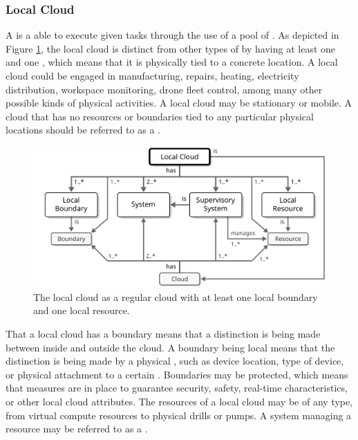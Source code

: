 \subsubsection{Local Cloud}
\label{sec:reference-model:system-of-systems:local-cloud}

A  is a  able to execute given tasks through the use of a pool of .
As depicted in Figure \ref{fig:local-cloud}, the local cloud is distinct from other types of  by having at least one  and one , which means that it is physically tied to a concrete location.
A local cloud could be engaged in manufacturing, repairs, heating, electricity distribution, workspace monitoring, drone fleet control, among many other possible kinds of physical activities.
A local cloud may be stationary or mobile.
A cloud that has no resources or boundaries tied to any particular physical locations should be referred to as a .

\begin{figure}[ht!]
  \centering
  \includegraphics[scale=0.9]{figures/local-cloud}
  \caption{
    The local cloud as a regular cloud with at least one local boundary and one local resource.
  }
  \label{fig:local-cloud}
\end{figure}

That a local cloud has a boundary means that a distinction is being made between  inside and outside the cloud.
A boundary being local means that the distinction is being made by a physical , such as device location, type of device, or physical attachment to a certain .
Boundaries may be protected, which means that measures are in place to guarantee security, safety, real-time characteristics, or other local cloud attributes.
The resources of a local cloud may be of any type, from virtual compute resources to physical drills or pumps.
A system managing a resource may be referred to as a .

